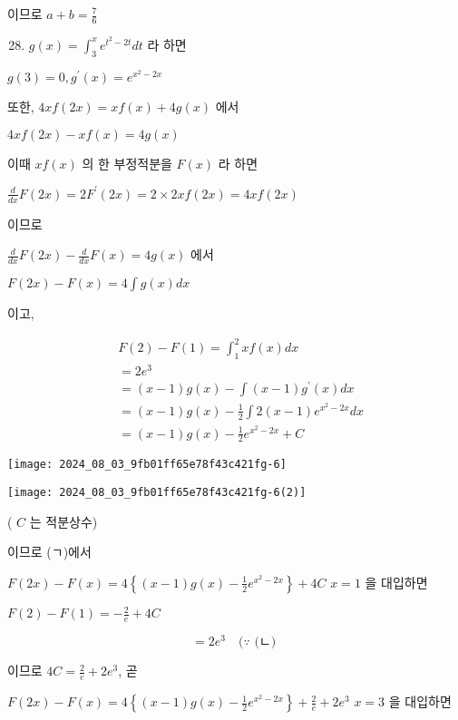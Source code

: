 \documentclass[10pt]{article}
\begin{document}
이므로 \(a+b=\frac{7}{6}\)

\begin{enumerate}
  \setcounter{enumi}{27}
  \item \(g(x)=\int_{3}^{x} e^{t^{2}-2 t} d t\) 라 하면
\end{enumerate}

\(g(3)=0, g^{\prime}(x)=e^{x^{2}-2 x}\)

또한, \(4 x f(2 x)=x f(x)+4 g(x)\) 에서

\(4 x f(2 x)-x f(x)=4 g(x)\)

이때 \(x f(x)\) 의 한 부정적분을 \(F(x)\) 라 하면

\(\frac{d}{d x} F(2 x)=2 F^{\prime}(2 x)=2 \times 2 x f(2 x)=4 x f(2 x)\)

이므로

\(\frac{d}{d x} F(2 x)-\frac{d}{d x} F(x)=4 g(x)\) 에서

\(F(2 x)-F(x)=4 \int g(x) d x\)

이고,

\[
\begin{aligned}
& F(2)-F(1)=\int_{1}^{2} x f(x) d x \\
& =2 e^{3} \\
& =(x-1) g(x)-\int(x-1) g^{\prime}(x) d x \\
& =(x-1) g(x)-\frac{1}{2} \int 2(x-1) e^{x^{2}-2 x} d x \\
& =(x-1) g(x)-\frac{1}{2} e^{x^{2}-2 x}+C
\end{aligned}
\]

\begin{center}
\texttt{[image: 2024\_08\_03\_9fb01ff65e78f43c421fg-6]}
\end{center}

\begin{center}
\texttt{[image: 2024\_08\_03\_9fb01ff65e78f43c421fg-6(2)]}
\end{center}

( \(C\) 는 적분상수)

이므로 (ㄱ)에서

\(F(2 x)-F(x)=4\left\{(x-1) g(x)-\frac{1}{2} e^{x^{2}-2 x}\right\}+4 C\) \(x=1\) 을 대입하면

\(F(2)-F(1)=-\frac{2}{e}+4 C\)

\[
=2 e^{3} \quad(\because \text { (ㄴ) }
\]

이므로 \(4 C=\frac{2}{e}+2 e^{3}\), 곧

\(F(2 x)-F(x)=4\left\{(x-1) g(x)-\frac{1}{2} e^{x^{2}-2 x}\right\}+\frac{2}{e}+2 e^{3}\) \(x=3\) 을 대입하면
\end{document}

